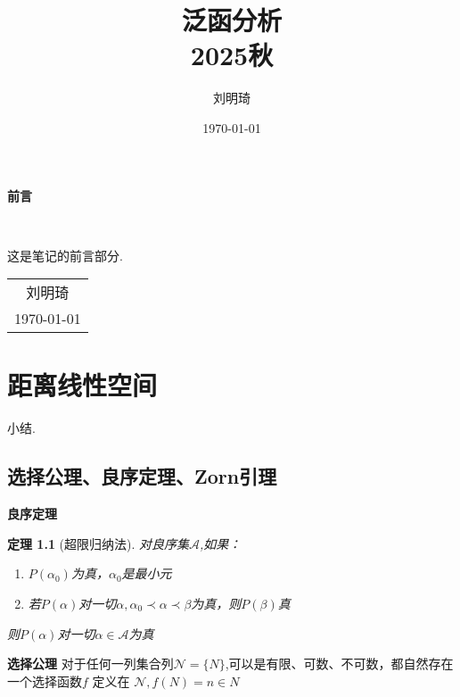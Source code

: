 \documentclass[12pt, a4paper, oneside, fontset=windows]{ctexbook}
\title{{\Huge{泛函分析}}\\2025秋}
\author{刘明琦}
\date{\today}
\newtheorem{theorem}{定理}[section]
\begin{document}
    \maketitle

    \setcounter{page}{1}

    \begin{center}
        \Huge\textbf{前言}
    \end{center}~\

    这是笔记的前言部分. 
    ~\\
    \begin{flushright}
        \begin{tabular}{c}
            刘明琦\\
            \today
        \end{tabular}
    \end{flushright}

    \newpage
    \setcounter{page}{1}
    \tableofcontents
    \newpage
    \setcounter{page}{1}

    \chapter{距离线性空间}

    小结. 

    \section{选择公理、良序定理、Zorn引理}

    {\bf 良序定理}
    \begin{theorem}[超限归纳法]
        对良序集$\mathcal{A}$,如果：
        \begin{enumerate}
            \item $P(\alpha_0)$为真，$\alpha_0$是最小元
            \item 若$P(\alpha)$对一切$\alpha,\alpha_0 \prec \alpha \prec \beta$为真，则$P(\beta)$真
        \end{enumerate}
        则$P(\alpha)$对一切$\alpha \in \mathcal{A}$为真
    \end{theorem}

    \begin{tcolorbox}
        {\bf 选择公理} 对于任何一列集合列$\mathcal{N}=\{N\}$,可以是有限、可数、不可数，都自然存在一个选择函数$f \text{ 定义在 }\mathcal{N},f(N)=n \in N$
    \end{tcolorbox}
\end{document}
